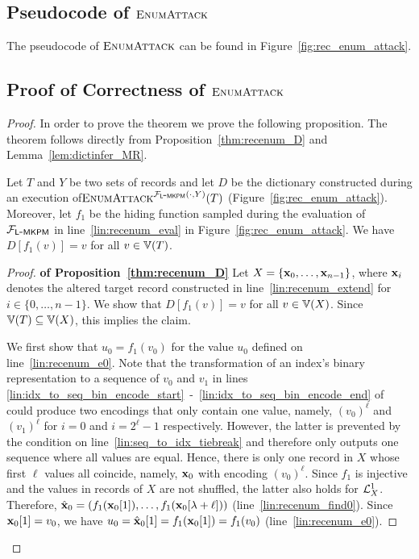 \subsection{Pseudocode of $\textsc{EnumAttack}$}
\label{sec:recenumattack:pseudocode}
The pseudocode of $\textsc{EnumAttack}$ can be found in Figure~\ref{fig:rec_enum_attack}.


\subsection{Proof of Correctness of $\textsc{EnumAttack}$}
\label{sec:recenumattack:correctness}
\begin{proof}
In order to prove the theorem we prove the following proposition. 
The theorem follows directly from Proposition~\ref{thm:recenum_D} and Lemma~\ref{lem:dictinfer_MR}.
\begin{proposition}\label{thm:recenum_D}
	Let $T$ and $Y$ be two sets of records and let
	$D$ be the dictionary constructed during an execution of\newline$\textsc{EnumAttack}^{\mathcal{F}_{\mathsf{L\mbox{-}MKPM}}(\cdot, Y)}(T)$ (Figure~\ref{fig:rec_enum_attack}).
	Moreover, let $f_1$ be the hiding function sampled during the evaluation of $\mathcal{F}_{\mathsf{L\mbox{-}MKPM}}$ in line~\ref{lin:recenum_eval} in Figure~\ref{fig:rec_enum_attack}. 
	We have $D[f_1(v)] = v$ for all $v \in \Ispace[T]$.
\end{proposition}
\begin{proof} \textbf{of Proposition~\ref{thm:recenum_D}} 
	Let $X = \{\mathbf{x}_0, \dots, \mathbf{x}_{n-1}\}$, where $\mathbf{x}_i$ denotes the altered target record constructed in 
	line~\ref{lin:recenum_extend} for $i \in \{0, \dots, n - 1\}$.
	We show that $D[f_1(v)] = v$ for all $v \in \Ispace[X]$.
	Since $\Ispace[T] \subseteq \Ispace[X]$, this implies the claim.
	
	We first show that $u_0 = f_1(v_0)$ for the value $u_0$ defined on line~\ref{lin:recenum_e0}.
	Note that the transformation of an index's binary representation to a sequence of $v_0$ and $v_1$
	in lines \ref{lin:idx_to_seq_bin_encode_start}~-~\ref{lin:idx_to_seq_bin_encode_end} of \IdxToSeq{}
	could produce two encodings that only contain one value, namely, $(v_0)^\ell$ and $(v_1)^\ell$
	for $i = 0$ and $i = 2^\ell - 1$ respectively.
	However, the latter is prevented by the condition on line~\ref{lin:seq_to_idx_tiebreak} and therefore
	\IdxToSeq{} only outputs one sequence where all values are equal.
	Hence, there is only one record in $X$ whose first $\ell$ values all coincide,
	namely, $\mathbf{x}_0$ with encoding $(v_0)^\ell$.
	Since $f_1$ is injective and the values in records of $X$ are not shuffled, 
	the latter also holds for $\mathcal{L}^{1}_X$.
	Therefore, $\hat{\mathbf{x}}_0 = (f_1(\mathbf{x}_0[1]), \dots, f_1(\mathbf{x}_0[\lambda + \ell]))$ (line~\ref{lin:recenum_find0}).
	Since $\mathbf{x}_0[1] = v_0$, we have $u_0 = \hat{\mathbf{x}}_0[1] = f_1(\mathbf{x}_0[1]) = f_1(v_0)$ (line~\ref{lin:recenum_e0}).
	

\end{proof}
\end{proof}
